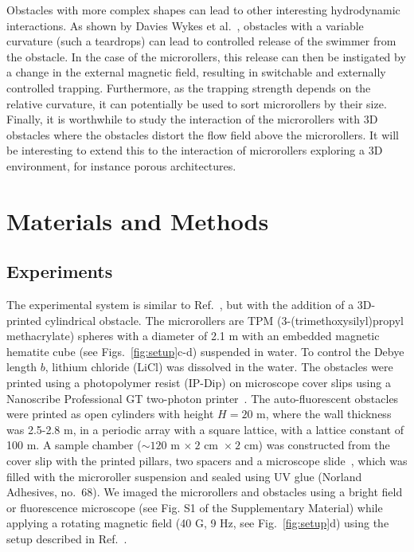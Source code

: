 \documentclass[12pt]{article}
\begin{document}
Obstacles with more complex shapes can lead to other interesting hydrodynamic interactions. As shown by Davies Wykes et al.~\cite{wykes2017guiding}, obstacles with a variable curvature (such a teardrops) can lead to controlled release of the swimmer from the obstacle. In the case of the microrollers, this release can then be instigated by a change in the external magnetic field, resulting in switchable and externally controlled trapping. 
Furthermore, as the trapping strength depends on the relative curvature, it can potentially be used to sort microrollers by their size.
Finally, it is worthwhile to study the interaction of the microrollers with 3D obstacles where the obstacles distort the flow field above the microrollers. It will be interesting to extend this to the interaction of microrollers exploring a 3D environment, for instance porous architectures.


\section*{Materials and Methods}
\subsection*{Experiments}
The experimental system is similar to Ref.~\cite{sprinkle2020active}, but with the addition of a 3D-printed cylindrical obstacle. The microrollers are TPM (3-(trimethoxysilyl)propyl methacrylate) spheres with a diameter of 2.1 \textmu m with an embedded magnetic hematite cube\cite{TPM} (see Figs.~\ref{fig:setup}c-d) suspended in water. To control the Debye length $b$, lithium chloride (LiCl) was dissolved in the water. 
The obstacles were printed using a photo\-polymer resist (IP-Dip) on microscope cover slips using a Nano\-scribe Professional GT two-photon printer~\cite{nishiguchi2018engineering,reinken2020organizing}. The auto-fluorescent obstacles were printed as open cylinders with height $H= 20$ \textmu m, where the wall thickness was 2.5-2.8 \textmu m, in a periodic array with a square lattice, with a lattice constant of 100 \textmu m.
A sample chamber (${\sim}120$ \textmu m ${\times}~2$ cm~${\times}~2$ cm) was constructed from the cover slip with the printed pillars, two spacers and a microscope slide~\cite{sprinkle2020active}, which was filled with the microroller suspension and sealed using UV glue (Norland Adhesives, no.\ 68). 
We imaged the microrollers and obstacles using a bright field or fluorescence microscope (see Fig. S1 of the Supplementary Material) while applying a rotating magnetic field (40 G, 9 Hz, see Fig.~\ref{fig:setup}d) using the setup described in Ref.~\cite{sprinkle2020active}. 
\end{document}
